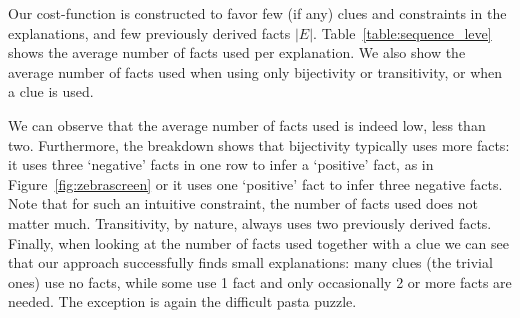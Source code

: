 \begin{table}
	\centering
	\caption{Puzzle explanation cost based on the cost function $f(I, C)$ and statistics on puzzle constraints}
	\label{table:sequence_leve}
\end{table}

Our cost-function is constructed to favor few (if any) clues and constraints in the explanations, and few previously derived facts $|E|$. Table~\ref{table:sequence_leve} shows the average number of facts used per explanation. We also show the average number of facts used when using only bijectivity or transitivity, or when a clue is used.\setlength{\parskip}{0pt}


We can observe that the average number of facts used is indeed low, less than two. Furthermore, the breakdown shows that bijectivity typically uses more facts: it uses three `negative' facts in one row to infer a `positive' fact, as in Figure~\ref{fig:zebrascreen} or it uses one `positive' fact to infer three negative facts. Note that for such an intuitive constraint, the number of facts used does not matter much. Transitivity, by nature, always uses two previously derived facts. Finally, when looking at the number of facts used together with a clue we can see that our approach successfully finds small explanations: many clues (the trivial ones) use no facts, while some use 1 fact and only occasionally 2 or more facts are needed. The exception is again the difficult pasta puzzle.

